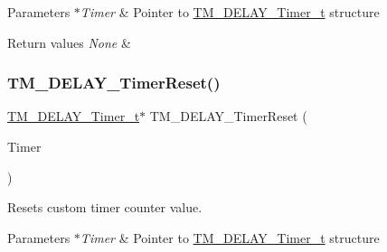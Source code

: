 \begin{DoxyParams}{Parameters}
{\em $\ast$\+Timer} & Pointer to \hyperlink{group___t_m___d_e_l_a_y___typedefs_gaf0beeb077a757f34c8b176464d9a0e85}{T\+M\+\_\+\+D\+E\+L\+A\+Y\+\_\+\+Timer\+\_\+t} structure \\
\hline
\end{DoxyParams}

\begin{DoxyRetVals}{Return values}
{\em None} & \\
\hline
\end{DoxyRetVals}
\mbox{\label{group___t_m___d_e_l_a_y___timer___functions_ga0817b5f2921d7e9b0efc9ea97a38a621}} 
\subsubsection{\texorpdfstring{T\+M\+\_\+\+D\+E\+L\+A\+Y\+\_\+\+Timer\+Reset()}{TM\_DELAY\_TimerReset()}}
{\footnotesize\ttfamily \hyperlink{group___t_m___d_e_l_a_y___typedefs_gaf0beeb077a757f34c8b176464d9a0e85}{T\+M\+\_\+\+D\+E\+L\+A\+Y\+\_\+\+Timer\+\_\+t}$\ast$ T\+M\+\_\+\+D\+E\+L\+A\+Y\+\_\+\+Timer\+Reset (\begin{DoxyParamCaption}\item[{\hyperlink{group___t_m___d_e_l_a_y___typedefs_gaf0beeb077a757f34c8b176464d9a0e85}{T\+M\+\_\+\+D\+E\+L\+A\+Y\+\_\+\+Timer\+\_\+t} $\ast$}]{Timer }\end{DoxyParamCaption})}



Resets custom timer counter value. 


\begin{DoxyParams}{Parameters}
{\em $\ast$\+Timer} & Pointer to \hyperlink{group___t_m___d_e_l_a_y___typedefs_gaf0beeb077a757f34c8b176464d9a0e85}{T\+M\+\_\+\+D\+E\+L\+A\+Y\+\_\+\+Timer\+\_\+t} structure \\
\hline
\end{DoxyParams}

